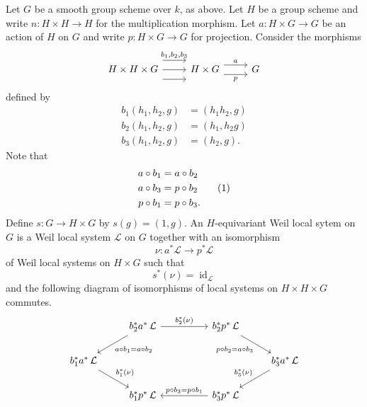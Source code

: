\documentclass[10pt]{amsart}
\theoremstyle{plain}
\theoremstyle{definition}
\DeclareMathOperator{\id}{id}
\newcommand{\iso}{{\ \cong\ }}
\newcommand{\cs}[1]{{\mathcal{#1}}}
\newcommand\numberthis{\addtocounter{equation}{1}\tag{\theequation}}
\begin{document}
Let $G$ be a smooth group scheme over $k$, as above.
Let $H$ be a group scheme and write $n : H \times H \to H$ for the multiplication morphism.
Let $a : H \times G\to G$ be an action of $H$ on $G$ 
and write $p : H\times G \to G$ for projection. 
Consider the morphisms
\[
\begin{tikzcd}
H \times H \times G 
\arrow[shift left=4]{r}{b_1, b_2, b_3} 
\arrow{r}{}
\arrow[shift right=4]{r}{} 
& H \times G 
\arrow[shift left=2]{r}{a}
\arrow[shift right=2]{r}[swap]{p}
 & G 
\end{tikzcd}
\]
defined by 
\begin{align*}
b_1(h_1,h_2,g) &= (h_1h_2,g) \\
b_2(h_1,h_2,g) &= (h_1,h_2g) \\
b_3(h_1,h_2,g) &= (h_2,g).
\end{align*}
Note that
\begin{align*}
a\circ b_1 &= a\circ b_2 \\
a\circ b_3 &= p\circ b_2 \numberthis \label{eqn:bap}\\
p\circ b_1 &= p\circ b_3.
\end{align*}
Define $s : G\to H\times G$ by $s(g) = (1,g)$.
An $H$-equivariant Weil local sytem on $G$ is a Weil local system $\cs{L}$ on $G$ together with an isomorphism  
\[
\nu : a^*\cs{L} \to p^*\cs{L}
\] 
of Weil local systems on $H\times G$ such that 
\begin{equation}\label{E1}
s^*(\nu) = \id_{\cs{L}}
\end{equation}
and the following diagram of isomorphisms of local systems on $H\times H\times G$ commutes. 
\begin{equation}\label{E2}
\begin{tikzcd}
\ &  \arrow{dl}{a\circ b_1 = a\circ b_2}  b_2^*  a^*\, \mathcal{L} \arrow{rr}{b_2^*(\nu)} && b_2^* p^*\, \mathcal{L} \arrow{dr}[swap]{p\circ b_2 = a\circ b_3} & \\
b_1^* a^*\, \mathcal{L} \arrow{dr}{b_1^*(\nu)} &&&&   \arrow{dl}[swap]{b_3^*(\nu)} b_3^* a^*\, \mathcal{L} \\
& b_1^* p^*\, \mathcal{L}  && \arrow{ll}[swap]{p\circ b_3 = p\circ b_1} b_3^* p^*\, \mathcal{L} & 
\end{tikzcd}
\end{equation}
\end{document}
